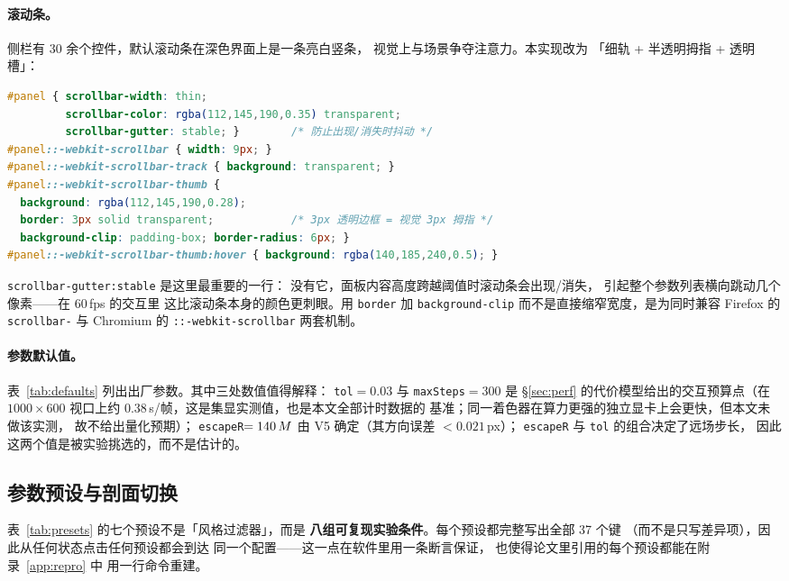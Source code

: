 \paragraph{滚动条。}
侧栏有 30 余个控件，默认滚动条在深色界面上是一条亮白竖条，
视觉上与场景争夺注意力。本实现改为
「细轨 + 半透明拇指 + 透明槽」：
\begin{lstlisting}[language=CSS, caption={自定义细滚动条（style.css 节选）}, label={lst:scroll}]
#panel { scrollbar-width: thin;
         scrollbar-color: rgba(112,145,190,0.35) transparent;
         scrollbar-gutter: stable; }        /* 防止出现/消失时抖动 */
#panel::-webkit-scrollbar { width: 9px; }
#panel::-webkit-scrollbar-track { background: transparent; }
#panel::-webkit-scrollbar-thumb {
  background: rgba(112,145,190,0.28);
  border: 3px solid transparent;            /* 3px 透明边框 = 视觉 3px 拇指 */
  background-clip: padding-box; border-radius: 6px; }
#panel::-webkit-scrollbar-thumb:hover { background: rgba(140,185,240,0.5); }
\end{lstlisting}
\noindent
\texttt{scrollbar-gutter:stable} 是这里最重要的一行：
没有它，面板内容高度跨越阈值时滚动条会出现/消失，
引起整个参数列表横向跳动几个像素——在 60\,fps 的交互里
这比滚动条本身的颜色更刺眼。用 \texttt{border} 加
\texttt{background-clip} 而不是直接缩窄宽度，是为同时兼容
Firefox 的 \texttt{scrollbar-\*} 与 Chromium 的
\texttt{::-webkit-scrollbar} 两套机制。

\paragraph{参数默认值。}
表~\ref{tab:defaults} 列出出厂参数。其中三处数值值得解释：
\texttt{tol}$=0.03$ 与 \texttt{maxSteps}$=300$ 是
\S\ref{sec:perf} 的代价模型给出的交互预算点（在 $1000\times600$
视口上约 $0.38$\,s/帧，这是集显实测值，也是本文全部计时数据的
基准；同一着色器在算力更强的独立显卡上会更快，但本文未做该实测，
故不给出量化预期）；
\texttt{escapeR}$=140\,M$ 由 V5 确定（其方向误差 $<0.021$\,px）；
\texttt{escapeR} 与 \texttt{tol} 的组合决定了远场步长，
因此这两个值是被实验挑选的，而不是估计的。



\subsection{参数预设与剖面切换}\label{sec:presets}



表~\ref{tab:presets} 的七个预设不是「风格过滤器」，而是
\textbf{八组可复现实验条件}。每个预设都完整写出全部 37 个键
（而不是只写差异项），因此从任何状态点击任何预设都会到达
同一个配置——这一点在软件里用一条断言保证，
也使得论文里引用的每个预设都能在附录~\ref{app:repro} 中
用一行命令重建。

